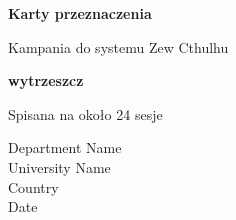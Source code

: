 \begin{titlepage}
   \begin{center}
       \vspace*{1cm}

       \textbf{Karty przeznaczenia}

       \vspace{0.5cm}
       Kampania do systemu Zew Cthulhu

       \vspace{1.5cm}

       \textbf{wytrzeszcz}

       \vfill

       Spisana na około 24 sesje

       \vspace{0.8cm}


       Department Name\\
       University Name\\
       Country\\
       Date

   \end{center}
\end{titlepage}
